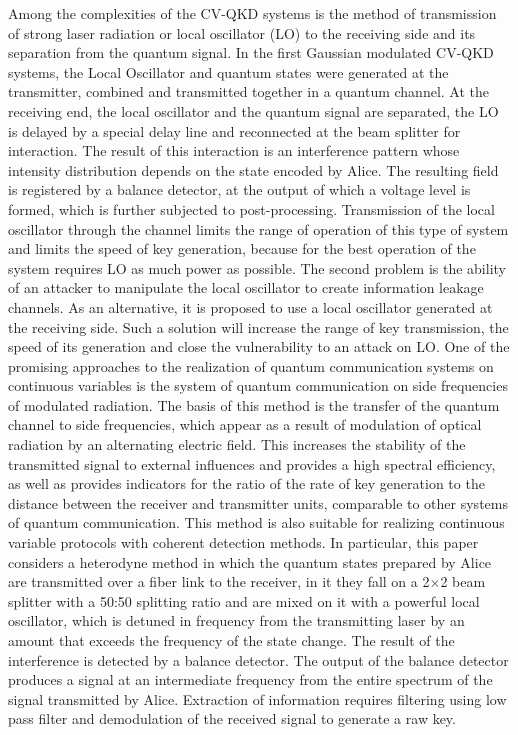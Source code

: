 Among the complexities of the CV-QKD systems is the method of transmission of strong laser radiation or local oscillator (LO) to the receiving side and its separation from the quantum signal. In the first Gaussian modulated CV-QKD systems, the Local Oscillator and quantum states were generated at the transmitter, combined and transmitted together in a quantum channel. At the receiving end, the local oscillator and the quantum signal are separated, the LO is delayed by a special delay line and reconnected at the beam splitter for interaction. The result of this interaction is an interference pattern whose intensity distribution depends on the state encoded by Alice. The resulting field is registered by a balance detector, at the output of which a voltage level is formed, which is further subjected to post-processing.  Transmission of the local oscillator through the channel limits the range of operation of this type of system and limits the speed of key generation, because for the best operation of the system requires LO as much power as possible. The second problem is the ability of an attacker to manipulate the local oscillator to create information leakage channels. As an alternative, it is proposed to use a local oscillator generated at the receiving side. Such a solution will increase the range of key transmission, the speed of its generation and close the vulnerability to an attack on LO.
One of the promising approaches to the realization of quantum communication systems on continuous variables is the system of quantum communication on side frequencies of modulated radiation. The basis of this method is the transfer of the quantum channel to side frequencies, which appear as a result of modulation of optical radiation by an alternating electric field. This increases the stability of the transmitted signal to external influences and provides a high spectral efficiency, as well as provides indicators for the ratio of the rate of key generation to the distance between the receiver and transmitter units, comparable to other systems of quantum communication. This method is also suitable for realizing continuous variable protocols with coherent detection methods. In particular, this paper considers a heterodyne method in which the quantum states prepared by Alice are transmitted over a fiber link to the receiver, in it they fall on a 2$\times$2 beam splitter with a 50:50 splitting ratio and are mixed on it with a powerful local oscillator, which is detuned in frequency from the transmitting laser by an amount that exceeds the frequency of the state change. The result of the interference is detected by a balance detector. The output of the balance detector produces a signal at an intermediate frequency from the entire spectrum of the signal transmitted by Alice. Extraction of information requires filtering using low pass filter and demodulation of the received signal to generate a raw key. 

